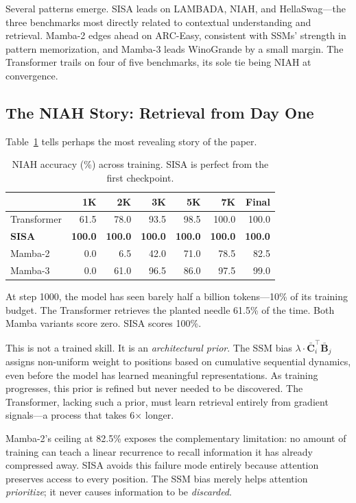 \documentclass[11pt]{article}
\begin{document}
Several patterns emerge. SISA leads on LAMBADA, NIAH, and HellaSwag---the three benchmarks most directly related to contextual understanding and retrieval. Mamba-2 edges ahead on ARC-Easy, consistent with SSMs' strength in pattern memorization, and Mamba-3 leads WinoGrande by a small margin. The Transformer trails on four of five benchmarks, its sole tie being NIAH at convergence.

\subsection{The NIAH Story: Retrieval from Day One}

Table~\ref{tab:niah} tells perhaps the most revealing story of the paper.

\begin{table}[h]
\centering
\caption{NIAH accuracy (\%) across training. SISA is perfect from the first checkpoint.}
\label{tab:niah}
\begin{tabular}{lrrrrrr}
\toprule
& \textbf{1K} & \textbf{2K} & \textbf{3K} & \textbf{5K} & \textbf{7K} & \textbf{Final} \\
\midrule
Transformer & 61.5 & 78.0 & 93.5 & 98.5 & 100.0 & 100.0 \\
\textbf{SISA} & \textbf{100.0} & \textbf{100.0} & \textbf{100.0} & \textbf{100.0} & \textbf{100.0} & \textbf{100.0} \\
Mamba-2 & 0.0 & 6.5 & 42.0 & 71.0 & 78.5 & 82.5 \\
Mamba-3 & 0.0 & 61.0 & 96.5 & 86.0 & 97.5 & 99.0 \\
\bottomrule
\end{tabular}
\end{table}

At step 1000, the model has seen barely half a billion tokens---10\% of its training budget. The Transformer retrieves the planted needle 61.5\% of the time. Both Mamba variants score zero. SISA scores 100\%.

This is not a trained skill. It is an \emph{architectural prior}. The SSM bias $\lambda \cdot \bar{\mathbf{C}}_i^\top \bar{\mathbf{B}}_j$ assigns non-uniform weight to positions based on cumulative sequential dynamics, even before the model has learned meaningful representations. As training progresses, this prior is refined but never needed to be discovered. The Transformer, lacking such a prior, must learn retrieval entirely from gradient signals---a process that takes 6$\times$ longer.

Mamba-2's ceiling at 82.5\% exposes the complementary limitation: no amount of training can teach a linear recurrence to recall information it has already compressed away. SISA avoids this failure mode entirely because attention preserves access to every position. The SSM bias merely helps attention \emph{prioritize}; it never causes information to be \emph{discarded}.
\end{document}
